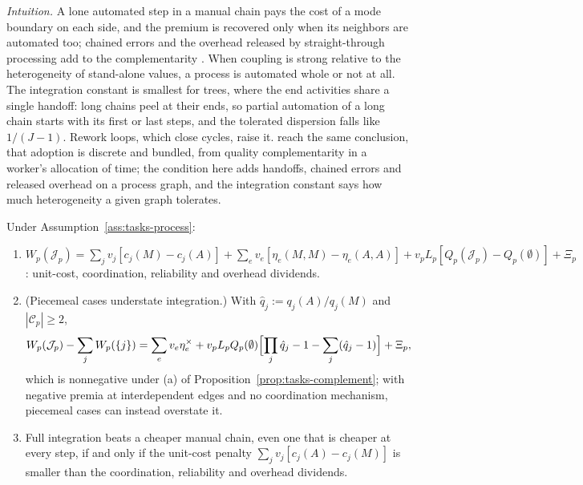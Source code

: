 \noindent\emph{Intuition.} A lone automated step in a manual chain pays the cost of a mode boundary on each side, and the premium is recovered only when its neighbors are automated too; chained errors and the overhead released by straight-through processing add to the complementarity \citep{milgrom1990economics,topkis1998supermodularity}. When coupling is strong relative to the heterogeneity of stand-alone values, a process is automated whole or not at all. The integration constant is smallest for trees, where the end activities share a single handoff: long chains peel at their ends, so partial automation of a long chain starts with its first or last steps, and the tolerated dispersion falls like $1/(J-1)$. Rework loops, which close cycles, raise it. \citet{gans2026oring} reach the same conclusion, that adoption is discrete and bundled, from quality complementarity in a worker's allocation of time; the condition here adds handoffs, chained errors and released overhead on a process graph, and the integration constant says how much heterogeneity a given graph tolerates.

\begin{proposition}\label{prop:tasks-integration}
Under Assumption~\ref{ass:tasks-process}:
\begin{enumerate}
\item[(a)] $W_p(\mathcal J_p)=\sum_jv_j[c_j(M)-c_j(A)]+\sum_ev_e[\eta_e(M,M)-\eta_e(A,A)]+v_pL_p[Q_p(\mathcal J_p)-Q_p(\emptyset)]+\Xi_p$: unit-cost, coordination, reliability and overhead dividends.
\item[(b)] (Piecemeal cases understate integration.) With $\hat q_j:=q_j(A)/q_j(M)$ and $|\mathcal C_p|\ge 2$,
\begin{equation}\label{eq:tasks-premium}
W_p(\mathcal J_p)-\sum_jW_p(\{j\})=\sum_ev_e\eta^\times_e+v_pL_pQ_p(\emptyset)\Bigl[\prod_j\hat q_j-1-\sum_j(\hat q_j-1)\Bigr]+\Xi_p,
\end{equation}
which is nonnegative under (a) of Proposition~\ref{prop:tasks-complement}; with negative premia at interdependent edges and no coordination mechanism, piecemeal cases can instead overstate it.
\item[(c)] Full integration beats a cheaper manual chain, even one that is cheaper at every step, if and only if the unit-cost penalty $\sum_jv_j[c_j(A)-c_j(M)]$ is smaller than the coordination, reliability and overhead dividends.
\end{enumerate}
\end{proposition}

